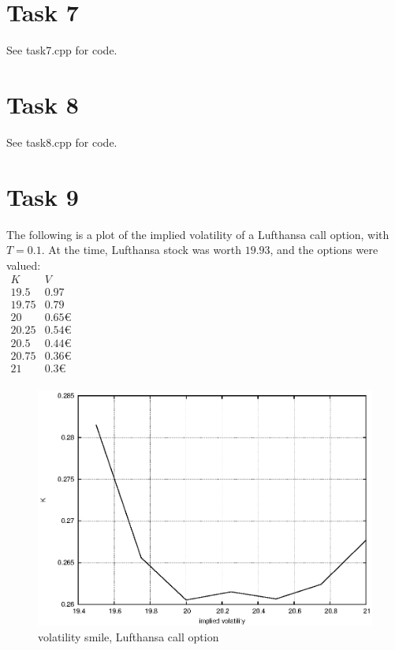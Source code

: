 \documentclass[]{article}
\begin{document}
\section*{Task 7}
See task7.cpp for code.

\section*{Task 8}
See task8.cpp for code.

\section*{Task 9}
The following is a plot of the implied volatility of a Lufthansa call option, with $T=0.1$. At the time, Lufthansa stock was worth $19.93$, and the options were valued:\\
$\begin{array}{c|c}
K & V\\
\hline
19.5&0.97\\
19.75&0.79\\
20&0.65€\\
20.25&0.54€\\
20.5&0.44€\\
20.75&0.36€\\
21&0.3€\\
\end{array}$\\

\begin{figure}[!ht]
\centering
\includegraphics[width=.9\textwidth]{task9.eps}
\caption{volatility smile, Lufthansa call option}
\label{fig:Task9}
\end{figure}
\end{document}
